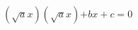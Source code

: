 \documentclass[preview]{standalone}
\begin{document}
\begin{center}
$(\sqrt{a}x)(\sqrt{a}x)$$ + bx + c = 0$
\end{center}
\end{document}

